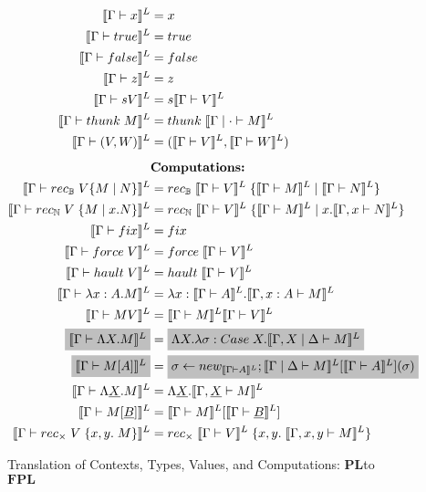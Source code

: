 \documentclass[acmsmall]{acmart}
\newcommand{\den}[1]{\llbracket #1\rrbracket}
\newcommand{\pl}{$\mathbf{PL}$}
\newcommand{\fpl}{$\mathbf{FPL}$}
\begin{document}
\begin{figure}[!htbp]
\begin{minipage}[t]{0.48\textwidth}
\[\begin{aligned}
      \den{\Gamma \vdash x}^L &= x \\
      \den{\Gamma \vdash true}^L &= true \\
      \den{\Gamma \vdash false}^L &= false \\
      \den{\Gamma \vdash z}^L &= z \\
      \den{\Gamma \vdash s V}^L &= s \den{\Gamma \vdash V}^L \\
      \den{\Gamma \vdash thunk\;M}^L &= thunk \; \den{\Gamma \;|\; \cdot \vdash M}^L \\
      \den{\Gamma \vdash (V,W)}^L &= (\den{\Gamma \vdash V}^L, \den{\Gamma \vdash W}^L) \\[0.5em]
      &\textbf{Computations:} \\
      \den{\Gamma \vdash rec_{\mathbb{B}}\;V \{M\;|\;N\}}^L &= rec_{\mathbb{B}}\;\den{\Gamma \vdash V}^L \;\{\den{\Gamma \vdash M}^L\;|\;\den{\Gamma \vdash N}^L\} \\
      \den{\Gamma \vdash rec_{\mathbb{N}}\;V\;\{M \;|\; x. N\}}^L &= rec_{\mathbb{N}}\;\den{\Gamma \vdash V}^L \;\{\den{\Gamma \vdash M}^L\;|\;x. \den{\Gamma, x \vdash N}^L\} \\
      \den{\Gamma \vdash fix}^L &= fix \\
      \den{\Gamma \vdash force \;V}^L &= force\;\den{\Gamma \vdash V}^L \\
      \den{\Gamma \vdash hault\;V}^L &= hault\;\den{\Gamma \vdash V}^L \\
      \den{\Gamma \vdash \lambda x :A. M}^L &= \lambda x:\den{\Gamma \vdash A}^L. \den{\Gamma, x : A \vdash M}^L \\
      \den{\Gamma \vdash MV}^L &= \den{\Gamma \vdash M}^L\den{\Gamma \vdash V}^L \\
      \colorbox{lightgray}{$\den{\Gamma \vdash \Lambda X. M}^L$} &= \colorbox{lightgray}{$\Lambda X. \lambda \sigma : Case\;X. \den{\Gamma,X \;|\;\Delta \vdash M}^L$} \\
      \colorbox{lightgray}{$\den{\Gamma \vdash M[A]}^L$} &= \colorbox{lightgray}{$\sigma \leftarrow new_{\den{\Gamma \vdash A}^L}; \den{\Gamma \;|\;\Delta \vdash M}^L[\den{\Gamma \vdash A}^L](\sigma)$} \\
      \den{\Gamma \vdash \Lambda \underline{X}.M}^L &= \Lambda \underline{X}. \den{\Gamma , \underline{X} \vdash M}^L \\
      \den{\Gamma \vdash M[\underline{B}]}^L &= \den{\Gamma \vdash M}^L[\den{\Gamma \vdash \underline{B}}^L] \\
      \den{\Gamma \vdash rec_\times \;V \;\{x,y.\;M\}}^L &= rec_\times \;\den{\Gamma \vdash V}^L\;\{x,y.\; \den{\Gamma, x,y \vdash M}^L\}
    \end{aligned}
    \]
  \end{minipage}
  \caption{Translation of Contexts, Types, Values, and Computations: \pl to \fpl}
  \label{fig:TranslationPLFPL}
\end{figure}
\end{document}
